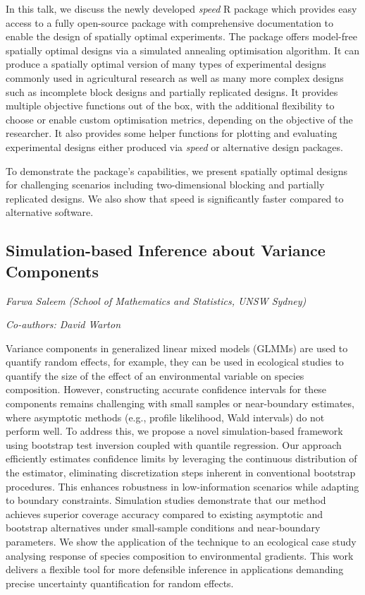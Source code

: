 \documentclass[
]{scrreprt}
\begin{document}
In this talk, we discuss the newly developed \emph{speed} R package
which provides easy access to a fully open-source package with
comprehensive documentation to enable the design of spatially optimal
experiments. The package offers model-free spatially optimal designs via
a simulated annealing optimisation algorithm. It can produce a spatially
optimal version of many types of experimental designs commonly used in
agricultural research as well as many more complex designs such as
incomplete block designs and partially replicated designs. It provides
multiple objective functions out of the box, with the additional
flexibility to choose or enable custom optimisation metrics, depending
on the objective of the researcher. It also provides some helper
functions for plotting and evaluating experimental designs either
produced via \emph{speed} or alternative design packages.

To demonstrate the package's capabilities, we present spatially optimal
designs for challenging scenarios including two-dimensional blocking and
partially replicated designs. We also show that speed is significantly
faster compared to alternative software.

\subsection{Simulation-based Inference about Variance
Components}\label{simulation-based-inference-about-variance-components}

\emph{Farwa Saleem} \emph{(School of Mathematics
and Statistics, UNSW Sydney)}

\emph{Co-authors: David Warton}

\setlength{\parskip}{0.5em}

Variance components in generalized linear mixed models (GLMMs) are used
to quantify random effects, for example, they can be used in ecological
studies to quantify the size of the effect of an environmental variable
on species composition. However, constructing accurate confidence
intervals for these components remains challenging with small samples or
near-boundary estimates, where asymptotic methods (e.g., profile
likelihood, Wald intervals) do not perform well. To address this, we
propose a novel simulation-based framework using bootstrap test
inversion coupled with quantile regression. Our approach efficiently
estimates confidence limits by leveraging the continuous distribution of
the estimator, eliminating discretization steps inherent in conventional
bootstrap procedures. This enhances robustness in low-information
scenarios while adapting to boundary constraints. Simulation studies
demonstrate that our method achieves superior coverage accuracy compared
to existing asymptotic and bootstrap alternatives under small-sample
conditions and near-boundary parameters. We show the application of the
technique to an ecological case study analysing response of species
composition to environmental gradients. This work delivers a flexible
tool for more defensible inference in applications demanding precise
uncertainty quantification for random effects.
\end{document}
